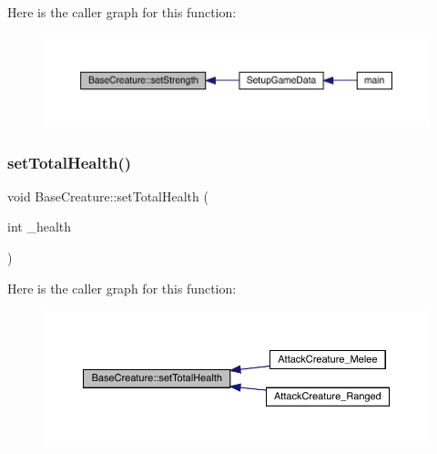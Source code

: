 Here is the caller graph for this function\+:
\nopagebreak
\begin{figure}[H]
\begin{center}
\leavevmode
\includegraphics[width=350pt]{d2/d3b/class_base_creature_a3a2eb318b9c5d849a02884b20e32f83d_icgraph}
\end{center}
\end{figure}
\mbox{\label{class_base_creature_a82f847585033035597700b071e40611f}} 
\subsubsection{\texorpdfstring{set\+Total\+Health()}{setTotalHealth()}}
{\footnotesize\ttfamily void Base\+Creature\+::set\+Total\+Health (\begin{DoxyParamCaption}\item[{int}]{\+\_\+health }\end{DoxyParamCaption})}

Here is the caller graph for this function\+:
\nopagebreak
\begin{figure}[H]
\begin{center}
\leavevmode
\includegraphics[width=350pt]{d2/d3b/class_base_creature_a82f847585033035597700b071e40611f_icgraph}
\end{center}
\end{figure}
\mbox{\label{class_base_creature_ae1cb6e6d01d0c369433fb1fb20803f91}} 
